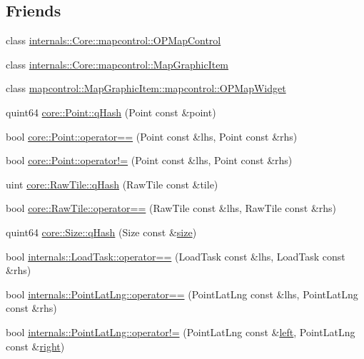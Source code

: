 \subsection*{Friends}
\begin{DoxyCompactItemize}
\item 
class \hyperlink{group___o_p_map_widget_ga88abf786b489e97fc16ff6c07da3626e}{internals\-::\-Core\-::mapcontrol\-::\-O\-P\-Map\-Control}
\item 
class \hyperlink{group___o_p_map_widget_ga4fb537bcd209fc77cf5b8c9e38360c07}{internals\-::\-Core\-::mapcontrol\-::\-Map\-Graphic\-Item}
\item 
class \hyperlink{group___o_p_map_widget_gaab6f3be35d4d41ee35530f402954d903}{mapcontrol\-::\-Map\-Graphic\-Item\-::mapcontrol\-::\-O\-P\-Map\-Widget}
\item 
quint64 \hyperlink{group___o_p_map_widget_ga8feadb5b08ae788a3b3149c500a8577c}{core\-::\-Point\-::q\-Hash} (Point const \&point)
\item 
bool \hyperlink{group___o_p_map_widget_gad4a997c3713478cec06dca233eeefdba}{core\-::\-Point\-::operator==} (Point const \&lhs, Point const \&rhs)
\item 
bool \hyperlink{group___o_p_map_widget_ga5f23d9a5e9c27a7fb6560e248ba8950e}{core\-::\-Point\-::operator!=} (Point const \&lhs, Point const \&rhs)
\item 
uint \hyperlink{group___o_p_map_widget_ga7b7411b1b50d2977c787264eb948910a}{core\-::\-Raw\-Tile\-::q\-Hash} (Raw\-Tile const \&tile)
\item 
bool \hyperlink{group___o_p_map_widget_ga7b53343b44511baed2e1587fdd5c88aa}{core\-::\-Raw\-Tile\-::operator==} (Raw\-Tile const \&lhs, Raw\-Tile const \&rhs)
\item 
quint64 \hyperlink{group___o_p_map_widget_ga49c2077e2f80e6178a3dfbda52f03e88}{core\-::\-Size\-::q\-Hash} (Size const \&\hyperlink{glext_8h_a014d89bd76f74ef3a29c8f04b473eb76}{size})
\item 
bool \hyperlink{group___o_p_map_widget_ga6780adf9ff8340f912353a6ef6e68751}{internals\-::\-Load\-Task\-::operator==} (Load\-Task const \&lhs, Load\-Task const \&rhs)
\item 
bool \hyperlink{group___o_p_map_widget_ga9265718a15e315e6d89a008c945393b3}{internals\-::\-Point\-Lat\-Lng\-::operator==} (Point\-Lat\-Lng const \&lhs, Point\-Lat\-Lng const \&rhs)
\item 
bool \hyperlink{group___o_p_map_widget_gab7da08dc85e294bae6bc1e2aed690d7f}{internals\-::\-Point\-Lat\-Lng\-::operator!=} (Point\-Lat\-Lng const \&\hyperlink{glext_8h_a85b8f6c07fbc1fb5d77c2ae090f21995}{left}, Point\-Lat\-Lng const \&\hyperlink{glext_8h_a5ffadbbacc6b89cf6218bc43b384d3fe}{right})

\end{DoxyCompactItemize}
